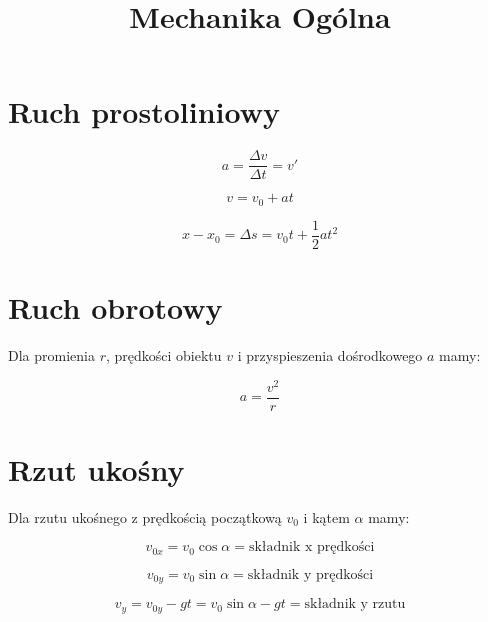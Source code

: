 \documentclass{../notatki}
\title{Mechanika Ogólna}
\begin{document}
\tableofcontents

\section{Ruch prostoliniowy}

$$
a = \frac{\Delta v}{\Delta t} = v'
$$

$$
v = v_0 + at
$$

$$
x - x_0 = \Delta s = v_0t + \frac{1}{2}a t^2
$$

\section{Ruch obrotowy}

Dla promienia $r$, prędkości obiektu $v$ i przyspieszenia dośrodkowego $a$ mamy:

$$
a = \frac{v^2}{r}
$$

\section{Rzut ukośny}

Dla rzutu ukośnego z prędkością początkową $v_0$ i kątem $\alpha$ mamy:

$$
v_{0x} = v_0 \cos \alpha = \text{składnik x prędkości}
$$

$$
v_{0y} = v_0 \sin \alpha = \text{składnik y prędkości}
$$

$$
v_y = v_{0y} - gt = v_0 \sin \alpha - gt = \text{składnik y rzutu}
$$
\end{document}
